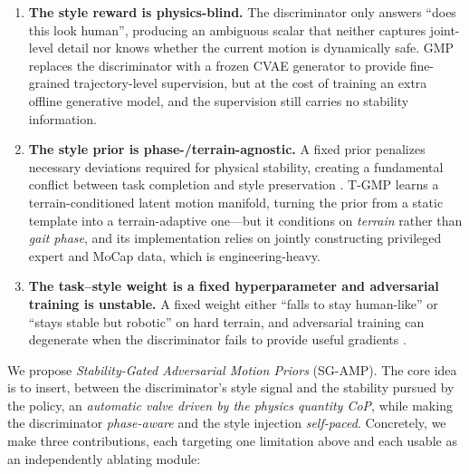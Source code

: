 \documentclass[conference]{IEEEtran}
\begin{document}
\begin{enumerate}
    \item \textbf{The style reward is physics-blind.} The discriminator only answers ``does this look human'', producing an ambiguous scalar that neither captures joint-level detail \cite{zhang2025gmp} nor knows whether the current motion is dynamically safe. GMP \cite{zhang2025gmp} replaces the discriminator with a frozen CVAE generator to provide fine-grained trajectory-level supervision, but at the cost of training an extra offline generative model, and the supervision still carries no stability information.
    \item \textbf{The style prior is phase-/terrain-agnostic.} A fixed prior penalizes necessary deviations required for physical stability, creating a fundamental conflict between task completion and style preservation \cite{peng2021amp, guo2026tgmp}. T-GMP \cite{guo2026tgmp} learns a terrain-conditioned latent motion manifold, turning the prior from a static template into a terrain-adaptive one---but it conditions on \emph{terrain} rather than \emph{gait phase}, and its implementation relies on jointly constructing privileged expert and MoCap data, which is engineering-heavy.
    \item \textbf{The task--style weight is a fixed hyperparameter and adversarial training is unstable.} A fixed weight either ``falls to stay human-like'' or ``stays stable but robotic'' on hard terrain, and adversarial training can degenerate when the discriminator fails to provide useful gradients \cite{zhang2025gmp, guo2026tgmp}.
\end{enumerate}

We propose \emph{Stability-Gated Adversarial Motion Priors} (SG-AMP). The core idea is to insert, between the discriminator's style signal and the stability pursued by the policy, an \emph{automatic valve driven by the physics quantity CoP}, while making the discriminator \emph{phase-aware} and the style injection \emph{self-paced}. Concretely, we make three contributions, each targeting one limitation above and each usable as an independently ablating module:
\end{document}
